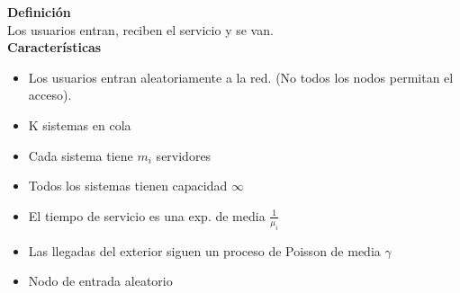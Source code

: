 \begin{minipage}{.22\textwidth}
	{\bf Definición} \\
	Los usuarios entran, reciben el servicio y se van.\\
	{\bf Características}
	\begin{itemize}[leftmargin=*]
		\item Los usuarios entran aleatoriamente a la red. (No todos los nodos permitan el acceso).
		\item K sistemas en cola
		\item Cada sistema tiene $m_i$ servidores
		\item Todos los sistemas tienen capacidad ${\infty}$
		\item El tiempo de servicio es una exp. de media ${\frac{1}{\mu_i}}$
		\item Las llegadas del exterior siguen un proceso de Poisson de media $\gamma$
		\item Nodo de entrada aleatorio
	\end{itemize}
\end{minipage}

